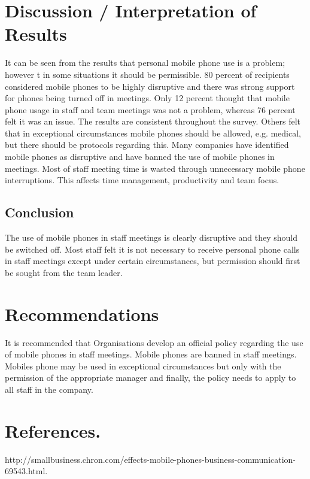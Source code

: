 \documentclass[12pt]{article}
\begin{document}
\section{Discussion / Interpretation of Results}
It can be seen from the results that personal mobile phone use is a problem; however t in some situations it should be permissible. 80 percent of recipients considered mobile phones to be highly disruptive and there was strong support for phones being turned off in meetings. Only 12 percent thought that mobile phone usage in staff and team meetings was not a problem, whereas 76 percent felt it was an issue. The results are consistent throughout the survey. Others felt that in exceptional circumstances mobile phones should be allowed, e.g. medical, but there should be protocols regarding this. Many companies have identified mobile phones as disruptive and have banned the use of mobile phones in meetings. Most of staff meeting time is wasted through unnecessary mobile phone interruptions. This affects time management, productivity and team focus.
\subsection{Conclusion }
The use of mobile phones in staff meetings is clearly disruptive and they should be switched off. Most staff felt it is not necessary to receive personal phone calls in staff meetings except under certain circumstances, but permission should first be sought from the team leader.
\section{Recommendations}
It is recommended that Organisations develop an official policy regarding the use of mobile phones in staff meetings. 
Mobile phones are banned in staff meetings.
Mobiles phone may be used in exceptional circumstances but only with the permission of the appropriate manager and finally, the policy needs to apply to all staff in the company.
\section{References.}
http://smallbusiness.chron.com/effects-mobile-phones-business-communication-
69543.html.
\end{document}
